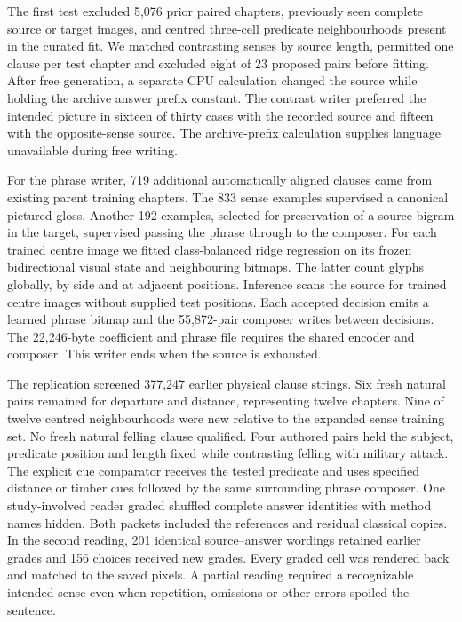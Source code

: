 \documentclass[12pt,a4paper]{article}
\providecommand{\DIFadd}[1]{{\protect\color{blue} \sf #1}} %
\begin{document}
\DIFadd{The first test excluded 5,076 prior paired chapters, previously seen complete source or target images, and centred three-cell predicate neighbourhoods present in the curated fit. We matched contrasting senses by source length, permitted one clause per test chapter and excluded eight of 23 proposed pairs before fitting. After free generation, a separate CPU calculation changed the source while holding the archive answer prefix constant. The contrast writer preferred the intended picture in sixteen of thirty cases with the recorded source and fifteen with the opposite-sense source. The archive-prefix calculation supplies language unavailable during free writing.
}

\DIFadd{For the phrase writer, 719 additional automatically aligned clauses came from existing parent training chapters. The 833 sense examples supervised a canonical pictured gloss. Another 192 examples, selected for preservation of a source bigram in the target, supervised passing the phrase through to the composer. For each trained centre image we fitted class-balanced ridge regression on its frozen bidirectional visual state and neighbouring bitmaps. The latter count glyphs globally, by side and at adjacent positions. Inference scans the source for trained centre images without supplied test positions. Each accepted decision emits a learned phrase bitmap and the 55,872-pair composer writes between decisions. The 22,246-byte coefficient and phrase file requires the shared encoder and composer. This writer ends when the source is exhausted.
}

\DIFadd{The replication screened 377,247 earlier physical clause strings. Six fresh natural pairs remained for departure and distance, representing twelve chapters. Nine of twelve centred neighbourhoods were new relative to the expanded sense training set. No fresh natural felling clause qualified. Four authored pairs held the subject, predicate position and length fixed while contrasting felling with military attack. The explicit cue comparator receives the tested predicate and uses specified distance or timber cues followed by the same surrounding phrase composer. One study-involved reader graded shuffled complete answer identities with method names hidden. Both packets included the references and residual classical copies. In the second reading, 201 identical source--answer wordings retained earlier grades and 156 choices received new grades. Every graded cell was rendered back and matched to the saved pixels. A partial reading required a recognizable intended sense even when repetition, omissions or other errors spoiled the sentence.
}
\end{document}
